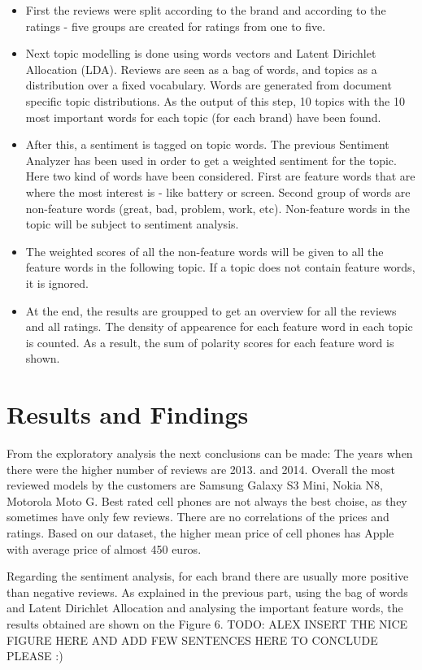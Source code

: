 \documentclass[11pt]{article}
\begin{document}
 \begin{itemize}
  \item First the reviews were split according to the brand and according to the ratings - five groups are created for ratings from one to five.
  \item Next topic modelling is done using words vectors and Latent Dirichlet Allocation (LDA). Reviews are seen as a bag of words, and topics as a distribution over a fixed vocabulary. Words are generated from document specific topic distributions. As the output of this step, 10 topics with the 10 most important words for each topic (for each brand) have been found.
  \item After this, a sentiment is tagged on topic words. The previous Sentiment Analyzer has been used in order to get a weighted sentiment for the topic. Here two kind of words have been considered. First are feature words that are where the most interest is - like battery or screen. Second group of words are non-feature words (great, bad, problem, work, etc). Non-feature words in the topic will be subject to sentiment analysis. 
  \item The weighted scores of all the non-feature words will be given to all the feature words in the following topic. If a topic does not contain feature words, it is ignored.
  \item At the end, the results are groupped to get an overview for all the reviews and all ratings. The density of appearence for each feature word in each topic is counted. As a result, the sum of polarity scores for each feature word is shown.
\end{itemize}


\section{Results and Findings}
From the exploratory analysis the next conclusions can be made: The years when there were the higher number of reviews are 2013. and 2014. Overall the most reviewed models by the customers are Samsung Galaxy S3 Mini, Nokia N8, Motorola Moto G. Best rated cell phones are not always the best choise, as they sometimes have only few reviews. There are no correlations of the prices and ratings. Based on our dataset, the higher mean price of cell phones has Apple with average price of almost 450 euros. 
 \par

Regarding the sentiment analysis, for each brand there are usually more positive than negative reviews. As explained in the previous part, using the bag of words and Latent Dirichlet Allocation and analysing the important feature words, the results obtained are shown on the Figure 6.  TODO: ALEX INSERT THE NICE FIGURE HERE AND ADD FEW SENTENCES HERE TO CONCLUDE PLEASE :)
\end{document}
